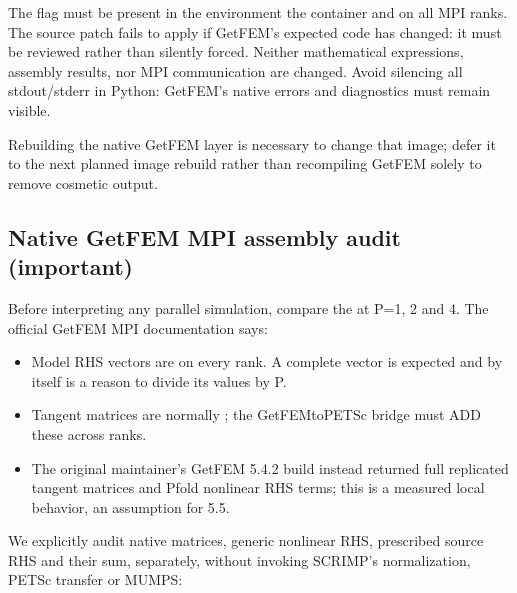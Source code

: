 \documentclass[letterpaper,10pt,english]{sphinxmanual}
\begin{document}
\sphinxAtStartPar
The flag must be present in the environment  the
container and on all MPI ranks. The source patch fails to apply if
GetFEM’s expected code has changed: it must be reviewed rather than
silently forced. Neither mathematical expressions, assembly results,
nor MPI communication are changed. Avoid silencing all stdout/stderr
in Python: GetFEM’s native errors and diagnostics must remain visible.

\sphinxAtStartPar
{}
Rebuilding the native GetFEM layer is necessary to change that image;
defer it to the next planned image rebuild rather than recompiling
GetFEM solely to remove cosmetic output.


\subsection{Native GetFEM MPI assembly audit (important)}
\label{\detokenize{install:native-getfem-mpi-assembly-audit-important}}
\sphinxAtStartPar
Before interpreting any parallel simulation, compare the  at P=1, 2 and 4. The official GetFEM MPI
documentation says:
\begin{itemize}
\item {} 
\sphinxAtStartPar
Model RHS vectors are  on
every rank. A complete vector is expected and by itself is 
a reason to divide its values by P.

\item {} 
\sphinxAtStartPar
Tangent matrices are normally ;
the GetFEM\sphinxhyphen{}to\sphinxhyphen{}PETSc bridge must ADD these across ranks.

\item {} 
\sphinxAtStartPar
The original maintainer’s GetFEM 5.4.2 build instead returned
full replicated tangent matrices and P\sphinxhyphen{}fold nonlinear RHS terms;
this is a measured local behavior,  an assumption for 5.5.

\end{itemize}

\sphinxAtStartPar
We explicitly audit native matrices, generic nonlinear RHS,
prescribed source RHS and their sum, separately, without invoking
SCRIMP’s normalization, PETSc transfer or MUMPS:
\end{document}
